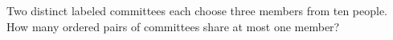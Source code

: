 Two distinct labeled committees each choose three members from ten people. How many ordered pairs of committees share at most one member?
